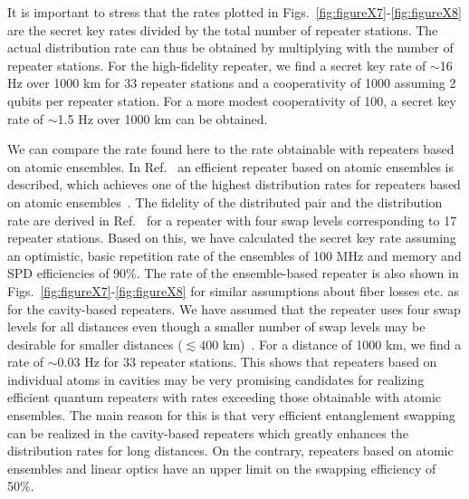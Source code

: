 It is important to stress that the rates plotted in
Figs.~\ref{fig:figureX7}-\ref{fig:figureX8} are the secret key rates divided by
the total number of repeater stations. The actual distribution rate can thus be
obtained by multiplying with the number of repeater stations. For the
high-fidelity repeater, we find a secret key rate of $\sim$16 Hz over 1000 km
for 33 repeater stations and a cooperativity of 1000 assuming 2 qubits per
repeater station.  For a more modest cooperativity of 100, a secret key rate of
$\sim$1.5 Hz over 1000 km can be obtained.

We can compare the rate found here to the rate obtainable with repeaters based
on atomic ensembles. In Ref.~\cite{sangouard1} an efficient repeater based on
atomic ensembles is described, which achieves one of the highest distribution
rates for repeaters based on atomic ensembles~\cite{sangouard3}. The fidelity of
the distributed pair and the distribution rate are derived in
Ref.~\cite{sangouard1} for a repeater with four swap levels corresponding to 17
repeater stations.  Based on this, we have calculated the secret key rate
assuming an optimistic, basic repetition rate of the ensembles of 100 MHz and
memory and SPD efficiencies of 90\%. The rate of the ensemble-based repeater is
also shown in Figs.~\ref{fig:figureX7}-\ref{fig:figureX8} for similar
assumptions about fiber losses etc. as for the cavity-based repeaters. We have
assumed that the repeater uses four swap levels for all distances even though a
smaller number of swap levels may be desirable for smaller distances
($\lesssim400$ km)~\cite{sangouard1}. For a distance of 1000 km, we find a rate
of $\sim0.03$ Hz for 33 repeater stations. This shows that repeaters based on
individual atoms in cavities may be very promising candidates for realizing
efficient quantum repeaters with rates exceeding those obtainable with atomic
ensembles. The main reason for this is that very efficient entanglement swapping
can be realized in the cavity-based repeaters which greatly enhances the
distribution rates for long distances. On the contrary, repeaters based on
atomic ensembles and linear optics have an upper limit on the swapping
efficiency of 50\%.

